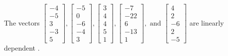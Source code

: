 \begin{exercise}
\begin{exerciseStatement}
  \end{exerciseStatement}
  \begin{exerciseAnswer}
   The vectors \(\left[\begin{array}{r}
-4 \\
-5 \\
3 \\
-3 \\
5
\end{array}\right] , \left[\begin{array}{r}
-5 \\
0 \\
-6 \\
-4 \\
3
\end{array}\right] , \left[\begin{array}{r}
3 \\
4 \\
4 \\
5 \\
1
\end{array}\right] , \left[\begin{array}{r}
-7 \\
-22 \\
6 \\
-13 \\
1
\end{array}\right] , \text{ and } \left[\begin{array}{r}
4 \\
2 \\
-6 \\
2 \\
-5
\end{array}\right]\) are 
  	 linearly dependent  .
  


  \end{exerciseAnswer}
\end{exercise}